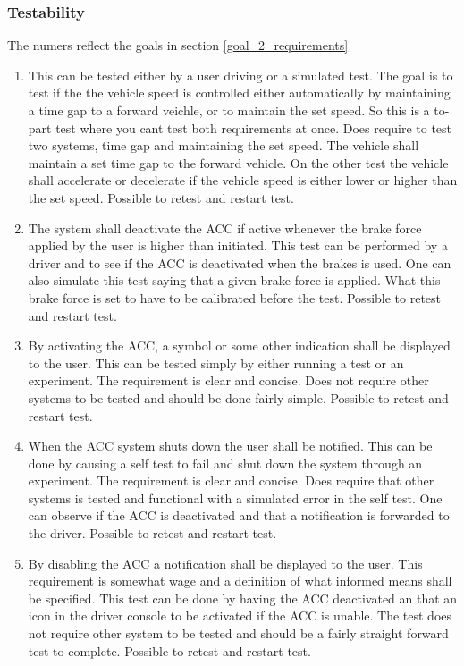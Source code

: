\subsubsection{Testability}
The numers reflect the goals in section \ref{goal_2_requirements}
\begin{enumerate}
    \item This can be tested either by a user driving or a simulated test. The goal is to test if the the vehicle speed is controlled either automatically by maintaining a time gap to a forward veichle, or to maintain the set speed. So this is a to-part test where you cant test both requirements at once. Does require to test two systems, time gap and maintaining the set speed. The vehicle shall maintain a set time gap to the forward vehicle. On the other test the vehicle shall accelerate or decelerate if the vehicle speed is either lower or higher than the set speed. Possible to retest and restart test.
    \item The system shall deactivate the ACC if active whenever the brake force applied by the user is higher than initiated. This test can be performed by a driver and to see if the ACC is deactivated when the brakes is used. One can also simulate this test saying that a given brake force is applied. What this brake force is set to have to be calibrated before the test. Possible to retest and restart test.
    \item By activating the ACC, a symbol or some other indication shall be displayed to the user. This can be tested simply by either running a test or an experiment. The requirement is clear and concise. Does not require other systems to be tested and should be done fairly simple. Possible to retest and restart test.
    \item When the ACC system shuts down the user shall be notified. This can be done by causing a self test to fail and shut down the system through an experiment. The requirement is clear and concise. Does require that other systems is tested and functional with a simulated error in the self test. One can observe if the ACC is deactivated and that a notification is forwarded to the driver. Possible to retest and restart test.
    \item By disabling the ACC a notification shall be displayed to the user. This requirement is somewhat wage and a definition of what informed means shall be specified. This test can be done by having the ACC deactivated an that an icon in the driver console to be activated if the ACC is unable. The test does not require other system to be tested and should be a fairly straight forward test to complete. Possible to retest and restart test.

\end{enumerate}

